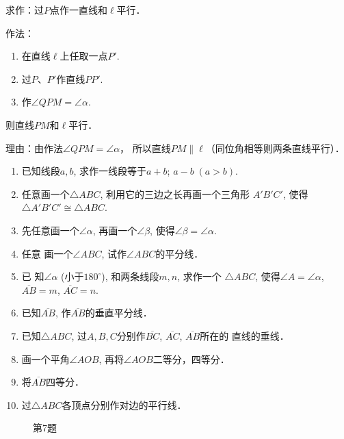 求作：过$P$点作一直线和$\ell$平行．

作法：
\begin{enumerate}
\item 在直线$\ell$上任取一点$P'$.
\item 过$P$、$P'$作直线$PP'$.
\item 作$\angle QPM=\angle\alpha$.
\end{enumerate}
则直线$PM$和$\ell$平行．

理由：由作法$\angle QPM=\angle\alpha$，
所以直线$PM\parallel \ell$（同位角相等则两条直线平行）．



\begin{ex}
\begin{enumerate}
	\item 已知线段$a,b$, 求作一线段等于$a+b$; $a-b\; (a>b)$.
	\item 任意画一个$\triangle ABC$, 利用它的三边之长再画一个三角形
$A'B'C'$, 使得$\triangle A'B'C'\cong \triangle ABC$.
	\item 先任意画一个$\angle \alpha$, 再画一个$\angle \beta$, 使得$\angle \beta=\angle\alpha$.
	\item 任意
	画一个$\angle ABC$, 试作$\angle ABC$的平分线．
	\item 已
	知$\angle \alpha$ (小于$180^{\circ}$), 和两条线段$m,n$, 求作一个
	$\triangle 
	ABC$, 使得$\angle A=\angle \alpha$, $\overline{AB}=m$, $\overline{AC}=n$.
	\item 已知$\overline{AB}$, 作$\overline{AB}$的垂直平分线．
	\item 已知$\triangle ABC$, 过$A,B,C$分别作$\overline{BC}$, $\overline{AC}$, $\overline{AB}$所在的
	直线的垂线．
	\item 画一个平角$\angle AOB$, 再将$\angle AOB$二等分，四等分．
	\item 将$\overline{AB}$四等分．
	\item 过$\triangle ABC$各顶点分别作对边的平行线．
\end{enumerate}
\end{ex}

\begin{figure}[htp]
	\centering
{}
	\caption*{第7题}
\end{figure}

